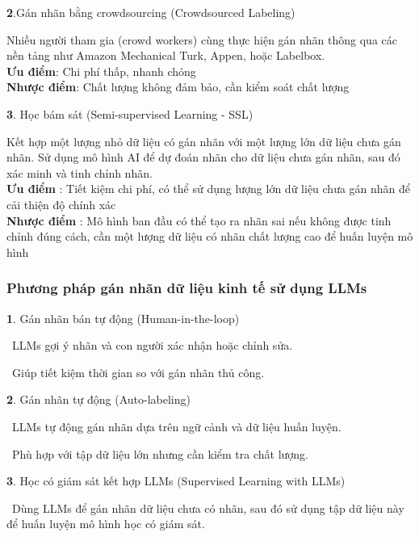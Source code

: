 \documentclass{article} %
\begin{document}
\textbf{2}.Gán nhãn bằng crowdsourcing (Crowdsourced Labeling)

\hspace{10pt} Nhiều người tham gia (crowd workers) cùng thực hiện gán nhãn thông qua các nền tảng như Amazon Mechanical Turk, Appen, hoặc Labelbox.\\
\textbf{Ưu điểm}: Chi phí thấp, nhanh chóng\\
\textbf{Nhược điểm}: Chất lượng không đảm bảo, cần kiểm soát chất lượng

\textbf{3}. Học bám sát (Semi-supervised Learning - SSL)

\hspace{10pt} Kết hợp một lượng nhỏ dữ liệu có gán nhãn với một lượng lớn dữ liệu chưa gán nhãn. 
Sử dụng mô hình AI để dự đoán nhãn cho dữ liệu chưa gán nhãn, sau đó xác minh và tinh chỉnh nhãn.\\
\textbf{Ưu điểm} : Tiết kiệm chi phí, có thể sử dụng lượng lớn dữ liệu chưa gán nhãn để cải thiện độ chính xác\\
\textbf{Nhược điểm} : Mô hình ban đầu có thể tạo ra nhãn sai nếu không được tinh chỉnh đúng cách, cần một lượng dữ liệu có nhãn chất lượng cao để huấn luyện mô hình

\subsubsection{Phương pháp gán nhãn dữ liệu kinh tế sử dụng LLMs}

\textbf{1}. Gán nhãn bán tự động (Human-in-the-loop)

\hspace{10pt} \textbullet\ LLMs gợi ý nhãn và con người xác nhận hoặc chỉnh sửa.

\hspace{10pt} \textbullet\ Giúp tiết kiệm thời gian so với gán nhãn thủ công.

\textbf{2}. Gán nhãn tự động (Auto-labeling)

\hspace{10pt} \textbullet\ LLMs tự động gán nhãn dựa trên ngữ cảnh và dữ liệu huấn luyện.

\hspace{10pt} \textbullet\ Phù hợp với tập dữ liệu lớn nhưng cần kiểm tra chất lượng.

\textbf{3}. Học có giám sát kết hợp LLMs (Supervised Learning with LLMs)

\hspace{10pt} \textbullet\ Dùng LLMs để gán nhãn dữ liệu chưa có nhãn, sau đó sử dụng tập dữ liệu này để huấn luyện mô hình học có giám sát.
\end{document}
